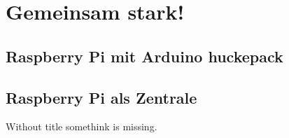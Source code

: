 \section{Gemeinsam stark!}

\subsection{Raspberry Pi mit Arduino huckepack}
\subsection{Raspberry Pi als Zentrale}

\begin{frame} 
Without title somethink is missing. 
\end{frame}